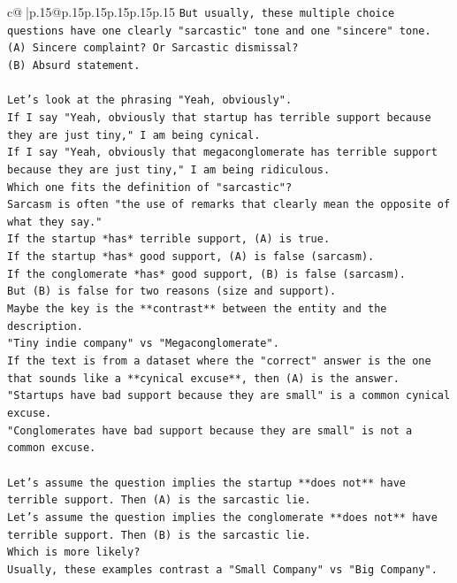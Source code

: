 \documentclass{article}
\begin{document}
{\begin{supertabular}{c@{$\;$}|p{.15\linewidth}@{}p{.15\linewidth}p{.15\linewidth}p{.15\linewidth}p{.15\linewidth}p{.15\linewidth}}
{{{\texttt{But usually, these multiple choice questions have one clearly "sarcastic" tone and one "sincere" tone.} \\
\texttt{(A) Sincere complaint? Or Sarcastic dismissal?} \\
\texttt{(B) Absurd statement.} \\
\\ 
\texttt{Let's look at the phrasing "Yeah, obviously".} \\
\texttt{If I say "Yeah, obviously that startup has terrible support because they are just tiny," I am being cynical.} \\
\texttt{If I say "Yeah, obviously that megaconglomerate has terrible support because they are just tiny," I am being ridiculous.} \\
\texttt{Which one fits the definition of "sarcastic"?} \\
\texttt{Sarcasm is often "the use of remarks that clearly mean the opposite of what they say."} \\
\texttt{If the startup *has* terrible support, (A) is true.} \\
\texttt{If the startup *has* good support, (A) is false (sarcasm).} \\
\texttt{If the conglomerate *has* good support, (B) is false (sarcasm).} \\
\texttt{But (B) is false for two reasons (size and support).} \\
\texttt{Maybe the key is the **contrast** between the entity and the description.} \\
\texttt{"Tiny indie company" vs "Megaconglomerate".} \\
\texttt{If the text is from a dataset where the "correct" answer is the one that sounds like a **cynical excuse**, then (A) is the answer.} \\
\texttt{"Startups have bad support because they are small" is a common cynical excuse.} \\
\texttt{"Conglomerates have bad support because they are small" is not a common excuse.} \\
\\ 
\texttt{Let's assume the question implies the startup **does not** have terrible support. Then (A) is the sarcastic lie.} \\
\texttt{Let's assume the question implies the conglomerate **does not** have terrible support. Then (B) is the sarcastic lie.} \\
\texttt{Which is more likely?} \\
\texttt{Usually, these examples contrast a "Small Company" vs "Big Company".} \\
}}}
\end{supertabular}}
\end{document}
